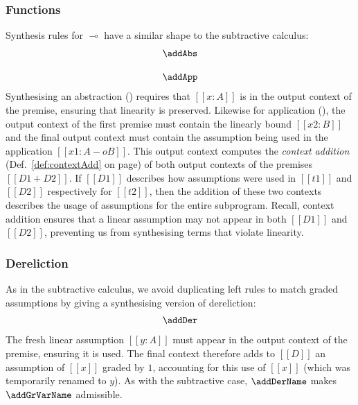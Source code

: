 \subsubsection{Functions}
Synthesis rules for $\multimap$ have a similar shape to the
subtractive calculus:
%
\begin{align*}
\begin{array}{c}
\addAbs
\\[1.25em]
\addApp
\end{array}
\end{align*}
%
Synthesising an abstraction (\addAbsName) requires that $[[x : A]]$ is in
the output context of the premise, ensuring that linearity is preserved.
Likewise for application (\addAppName), the output
context of the first premise must contain the linearly bound $[[x2 :
B]]$ and the final output context must contain the assumption being used in the
application $[[ x1 : A -o B ]]$. This output context computes the \emph{context
addition} (Def.~\ref{def:contextAdd} on page\pageref{def:contextAdd}) of both output contexts of the premises $[[D1 + D2]]$. If $[[D1]]$
describes how assumptions were used in $[[t1]]$ and $[[D2]]$ respectively for
$[[t2]]$, then the addition of these two contexts describes the usage of
assumptions for the entire subprogram. Recall, context addition
ensures that a linear assumption may not appear in both $[[D1]]$ and
$[[D2]]$, preventing us from synthesising terms that violate linearity.



\subsubsection{Dereliction}
As in the subtractive calculus,
we avoid duplicating left rules to
match graded assumptions by giving a synthesising version of dereliction:
\begin{align*}
  \addDer
  \end{align*}
%
The fresh linear assumption $[[ y : A ]]$ must
appear in the output context of the premise, ensuring it is used. The final
context therefore adds to $[[ D ]]$ an assumption of $[[x]]$ graded by
$1$, accounting for this use of $[[ x ]]$ (which was temporarily renamed to
$y$).
As with the subtractive case, $\addDerName$ makes $\addGrVarName$ admissible. 

